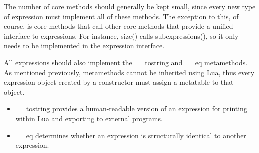 \documentclass{article}
\begin{document}
The number of core methods should generally be kept small, since every new type of expression must implement all of these methods. The exception to this, of course, is core methods that call other core methods that provide a unified interface to expressions. For instance, {\ttfamily size()} calls {\ttfamily subexpressions()}, so it only needs to be implemented in the expression interface.

All expressions should also implement the {\ttfamily \_\_tostring} and {\ttfamily \_\_eq} metamethods. As mentioned previously, metamethods cannot be inherited using Lua, thus every expression object created by a constructor must assign a metatable to that object.

\begin{itemize}
    \item {\ttfamily \_\_tostring} provides a human-readable version of an expression for printing within Lua and exporting to external programs. 
    
    \item {\ttfamily \_\_eq} determines whether an expression is structurally identical to another expression.
\end{itemize}
\end{document}

